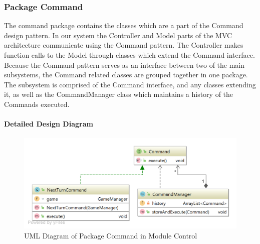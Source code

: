 \subsubsection{Package Command}
The command package contains the classes which are a part of the Command design pattern. In our system the Controller and Model parts of the MVC architecture communicate using the Command pattern. The Controller makes function calls to the Model through classes which extend the Command interface. Because the Command pattern serves as an interface between two of the main subsystems, the Command related classes are grouped together in one package. The subsystem is comprised of the Command interface, and any classes extending it, as well as the CommandManager class which maintains a history of the Commands executed.

\paragraph{Detailed Design Diagram}\mbox{}
\begin{figure}[H]
\centering
\includegraphics[width=15cm]{Source/Module/Control/Command/Control_Command.png}
\caption{UML Diagram of Package Command in Module Control}
\label{Control.Command}
\end{figure}



